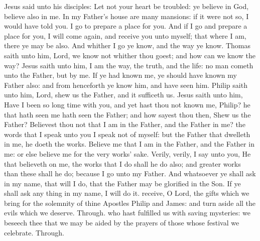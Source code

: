 
 Jesus said unto his disciples: Let not your heart be troubled: ye believe in God, believe also in me. In my Father's house are many mansions: if it were not so, I would have told you. I go to prepare a place for you. And if I go and prepare a place for you, I will come again, and receive you unto myself; that where I am, there ye may be also. And whither I go ye know, and the way ye know. Thomas saith unto him, Lord, we know not whither thou goest; and how can we know the way? Jesus saith unto him, I am the way, the truth, and the life: no man cometh unto the Father, but by me. If ye had known me, ye should have known my Father also: and from henceforth ye know him, and have seen him. Philip saith unto him, Lord, shew us the Father, and it sufficeth us. Jesus saith unto him, Have I been so long time with you, and yet hast thou not known me, Philip? he that hath seen me hath seen the Father; and how sayest thou then, Shew us the Father? Believest thou not that I am in the Father, and the Father in me? the words that I speak unto you I speak not of myself: but the Father that dwelleth in me, he doeth the works. Believe me that I am in the Father, and the Father in me: or else believe me for the very works' sake. Verily, verily, I say unto you, He that believeth on me, the works that I do shall he do also; and greater works than these shall he do; because I go unto my Father. And whatsoever ye shall ask in my name, that will I do, that the Father may be glorified in the Son. If ye shall ask any thing in my name, I will do it.
\secret
{} receive, O Lord, the gifts which we bring for the solemnity of thine Apostles Philip and James: and turn aside all the evils which we deserve. Through.
\postcommunion
{} who hast fulfilled us with saving mysteries: we beseech thee that we may be aided by the prayers of those whose festival we celebrate. Through.


